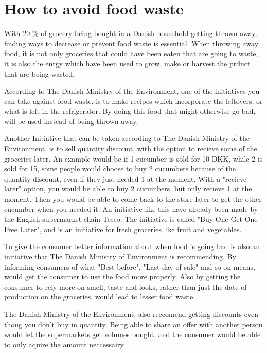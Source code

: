 \section{How to avoid food waste}

With 20 \% of grocery being bought in a Danish household getting thrown away, finding ways to decrease or prevent food waste is essential. When throwing away food, it is not only groceries that could have been eaten that are going to waste, it is also the enrgy which have been used to grow, make or harvest the prduct that are being wasted. 

According to The Danish Ministry of the Environment, one of the initiatives you can take against food waste, is to make recipes which incorporate the leftovers, or what is left in the refrigerator. By doing this food that might otherwise go bad, will be used instead of being thrown away. %

Another Initiative that can be taken according to The Danish Ministry of the Environment, is to sell quantity discount, with the option to recieve some of the groceries later. An example would be if 1 cucumber is sold for 10 DKK, while 2 is sold for 15, some people would choose to buy 2 cucumbers because of the quantity discount, even if they just needed 1 at the moment. With a "recieve later" option, you would be able to buy 2 cucumbers, but only recieve 1 at the moment. Then you would be able to come back to the store later to get the other cucumber when you needed it. An initiative like this have already been made by the English supermarket chain Tesco. The initiative is called "Buy One Get One Free Later", and is an initiative for fresh groceries like fruit and vegetables.

To give the consumer better information about when food is going bad is also an initiative that The Danish Ministry of Environment is recommending. By informing consumers of what "Best before", "Last day of sale" and so on means, would get the consumer to use the food more properly. Also by getting the consumer to rely more on smell, taste and looks, rather than just the date of production on the groceries, would lead to lesser food waste.

The Danish Ministry of the Environment, also reccomend getting discounts even thoug you don't buy in quantity. Being able to share an offer with another person would let the supermarkets get volumes bought, and the consumer would be able to only aquire the amount neccessairy.

